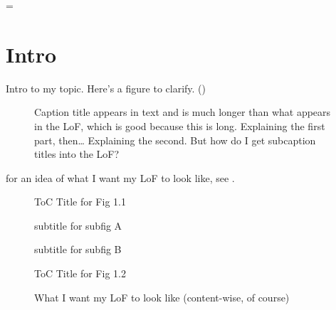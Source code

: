 \documentclass{memoir}
\begin{document}
\newdimen\LoFindent
\LoFindent = \parindent

\frontmatter

\tableofcontents*
\newpage
\listoffigures

\mainmatter
\chapter{Intro}
Intro to my topic. Here's a figure to clarify. ()

\begin{figure}[!b]
    \begin{subfigure}{\linewidth}
      \centering
      \label{subfig:introFigA}
      \label{subfig:introFigB}
    \end{subfigure}
    \caption[Full Caption Title for ToC]{Caption title appears in text and is much longer than what appears in the LoF, which is good because this is long.
         Explaining the first part, then\ldots
         Explaining the second. But how do I get subcaption titles into the LoF?
        }\label{fig:introFig}
\end{figure}

for an idea of what I want my LoF to look like, see .


\begin{figure}[!b]
ToC Title for Fig 1.1 \dotfill \pageref{fig:introFig}

\hspace{\LoFindent} subtitle for subfig A

\hspace{\LoFindent} subtitle for subfig B


ToC Title for Fig 1.2 \dotfill \pageref{fig:example}

\caption{What I want my LoF to look like (content-wise, of course)}\label{fig:example}
\end{figure}
\end{document}
